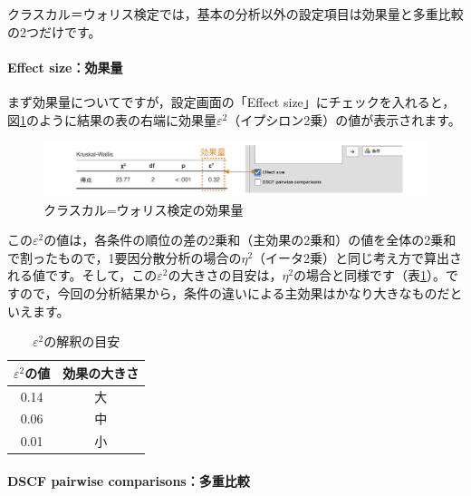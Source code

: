 \documentclass[
  12pt,
  a5jpaper,
  lualatex, ja=standard]{bxjsbook}
\begin{document}
クラスカル＝ウォリス検定では，基本の分析以外の設定項目は効果量と多重比較の2つだけです。

\hypertarget{effect-sizeux52b9ux679cux91cf-4}{%
\paragraph*{Effect size：効果量}\label{effect-sizeux52b9ux679cux91cf-4}}

まず効果量についてですが，設定画面の「Effect size」にチェックを入れると，図\ref{fig:ANOVA-kw-es}のように結果の表の右端に効果量\(\varepsilon^2\)（イプシロン2乗）の値が表示されます。

\begin{figure}[!ht]

{\centering \includegraphics[width=1\linewidth]{images/ANOVA/kw-es} 

}

\caption{クラスカル=ウォリス検定の効果量}\label{fig:ANOVA-kw-es}
\end{figure}

この\(\varepsilon^2\)の値は，各条件の順位の差の2乗和（主効果の2乗和）の値を全体の2乗和で割ったもので，1要因分散分析の場合の\(\eta^2\)（イータ2乗）と同じ考え方で算出される値です。そして，この\(\varepsilon^2\)の大きさの目安は，\(\eta^2\)の場合と同様です（表\ref{tab:ANOVA-kw-epsilon}）。ですので，今回の分析結果から，条件の違いによる主効果はかなり大きなものだといえます。

\begin{table}[H]

\caption{\label{tab:ANOVA-kw-epsilon}$\varepsilon^2$の解釈の目安}
\centering
\begin{tabular}[t]{cc}
\toprule
$\varepsilon^2$の値 & 効果の大きさ\\
\midrule
0.14 & 大\\
0.06 & 中\\
0.01 & 小\\
\bottomrule
\end{tabular}
\end{table}

\hypertarget{dscf-pairwise-comparisonsux591aux91cdux6bd4ux8f03}{%
\paragraph*{DSCF pairwise comparisons：多重比較}\label{dscf-pairwise-comparisonsux591aux91cdux6bd4ux8f03}}
\end{document}
